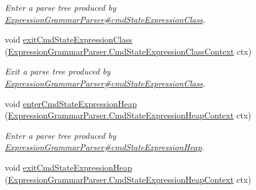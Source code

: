 \begin{DoxyCompactItemize}
\begin{DoxyCompactList}\small\item\em Enter a parse tree produced by \hyperlink{classgov_1_1nasa_1_1jpf_1_1inspector_1_1server_1_1expression_1_1parser_1_1_expression_grammar_parser_a7a61b20a8b2616173f6b566712b279dd}{Expression\+Grammar\+Parser\#cmd\+State\+Expression\+Class}. \end{DoxyCompactList}\item 
void \hyperlink{interfacegov_1_1nasa_1_1jpf_1_1inspector_1_1server_1_1expression_1_1parser_1_1_expression_grammar_listener_a5975c94af21213df10660bdbae541e73}{exit\+Cmd\+State\+Expression\+Class} (\hyperlink{classgov_1_1nasa_1_1jpf_1_1inspector_1_1server_1_1expression_1_1parser_1_1_expression_grammar_pa672388ef0800b4a3d173ab7548f6b406}{Expression\+Grammar\+Parser.\+Cmd\+State\+Expression\+Class\+Context} ctx)
\begin{DoxyCompactList}\small\item\em Exit a parse tree produced by \hyperlink{classgov_1_1nasa_1_1jpf_1_1inspector_1_1server_1_1expression_1_1parser_1_1_expression_grammar_parser_a7a61b20a8b2616173f6b566712b279dd}{Expression\+Grammar\+Parser\#cmd\+State\+Expression\+Class}. \end{DoxyCompactList}\item 
void \hyperlink{interfacegov_1_1nasa_1_1jpf_1_1inspector_1_1server_1_1expression_1_1parser_1_1_expression_grammar_listener_aca2d3671c1e115fd3e033e7e7614ff4f}{enter\+Cmd\+State\+Expression\+Heap} (\hyperlink{classgov_1_1nasa_1_1jpf_1_1inspector_1_1server_1_1expression_1_1parser_1_1_expression_grammar_pa4cb3092c60a124c5db4482cce4b4fe10}{Expression\+Grammar\+Parser.\+Cmd\+State\+Expression\+Heap\+Context} ctx)
\begin{DoxyCompactList}\small\item\em Enter a parse tree produced by \hyperlink{classgov_1_1nasa_1_1jpf_1_1inspector_1_1server_1_1expression_1_1parser_1_1_expression_grammar_parser_a5b90970e937c56fb82d43184d3d4d763}{Expression\+Grammar\+Parser\#cmd\+State\+Expression\+Heap}. \end{DoxyCompactList}\item 
void \hyperlink{interfacegov_1_1nasa_1_1jpf_1_1inspector_1_1server_1_1expression_1_1parser_1_1_expression_grammar_listener_acdda60da6c507e8c5d680b8cc82d5fbf}{exit\+Cmd\+State\+Expression\+Heap} (\hyperlink{classgov_1_1nasa_1_1jpf_1_1inspector_1_1server_1_1expression_1_1parser_1_1_expression_grammar_pa4cb3092c60a124c5db4482cce4b4fe10}{Expression\+Grammar\+Parser.\+Cmd\+State\+Expression\+Heap\+Context} ctx)

\end{DoxyCompactItemize}
